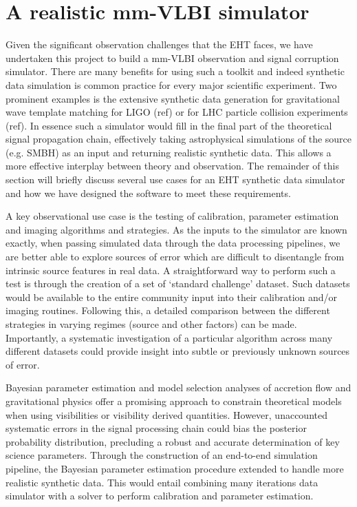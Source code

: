 \section{A realistic mm-VLBI simulator}

Given the significant observation challenges that the EHT faces, we have undertaken this project to build a mm-VLBI observation and signal corruption simulator.  There are many benefits for using such a toolkit and indeed synthetic data simulation is common practice for every major scientific experiment. Two prominent examples is the  extensive synthetic data generation for gravitational wave template matching for LIGO (ref) or for LHC particle collision experiments (ref). In essence such a simulator would fill in the final part of the theoretical signal propagation chain, effectively taking  astrophysical simulations of the source (e.g. SMBH) as an input and returning realistic synthetic data. This allows a more effective interplay between theory and observation. The remainder of this section will briefly discuss several use cases for an EHT synthetic data simulator and how we have designed the software to meet these requirements. 


A key observational use case is the testing of calibration, parameter estimation and imaging algorithms and strategies. As the inputs to the simulator are known exactly, when passing simulated data through the data processing pipelines, we are better able to explore sources of error which are difficult to disentangle from intrinsic source features in real data.  A straightforward way to perform such a test is through the creation of a set of `standard challenge' dataset. Such datasets would be available to the entire community input into their calibration and/or imaging routines. Following this, a detailed comparison between the different strategies in varying regimes (source and other factors) can be made. Importantly, a systematic investigation of a particular algorithm across many different datasets could provide insight into subtle or previously unknown sources of error.

Bayesian parameter estimation and model selection analyses of accretion flow \citep[e.g.][]{Broderick_2016} and gravitational physics \citep[e.g.][]{Broderick_2014, Psaltis_2016} offer a promising approach to constrain theoretical models when using visibilities or visibility derived quantities. However, unaccounted systematic errors in the signal processing chain could bias  the posterior probability distribution, precluding a robust and accurate determination of key science parameters. Through the construction of an end-to-end simulation pipeline, the Bayesian parameter estimation procedure extended to handle more realistic synthetic data. This would entail combining many iterations data simulator with a solver to perform calibration and parameter estimation. %

